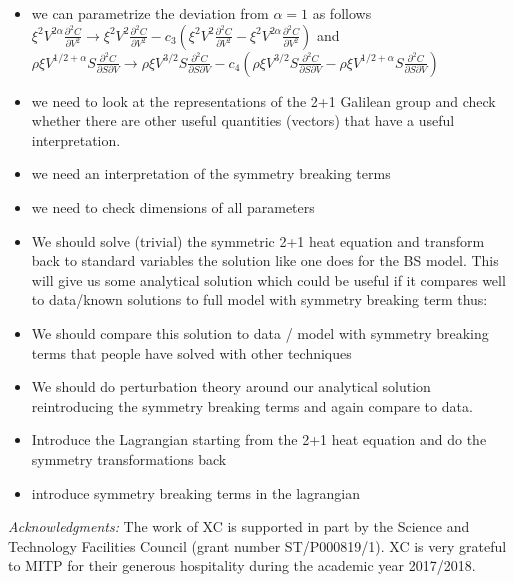 \documentclass[english,12pt]{article}
\def\to{\rightarrow}
\begin{document}
\begin{itemize}
\item we can parametrize the deviation from $\alpha=1$ as follows
$\xi^2 V^{2 \alpha}  \frac{\partial^2 C}{\partial V^2}\to\xi^2 V^{2}  \frac{\partial^2 C}{\partial V^2}- c_3 (\xi^2 V^{2}  \frac{\partial^2 C}{\partial V^2}-\xi^2 V^{2 \alpha}  \frac{\partial^2 C}{\partial V^2}) $ and $\rho \xi V^{1/2+\alpha} S \frac{\partial^2 C}{\partial S \partial V}\to \rho \xi V^{3/2} S \frac{\partial^2 C}{\partial S \partial V} 
- c_4(\rho \xi V^{3/2} S \frac{\partial^2 C}{\partial S \partial V} -
\rho \xi V^{1/2+\alpha} S \frac{\partial^2 C}{\partial S \partial V}) $ 
\item we need to look at the representations of the 2+1 Galilean group and check whether there are other useful quantities (vectors) that have a useful interpretation.
\item we need an interpretation of the symmetry breaking terms
\item we need to check dimensions of all parameters
\item We should solve (trivial) the symmetric 2+1 heat equation and transform back to standard variables the solution like one does for the BS model. This will give us some analytical solution which could be useful if it compares well to data/known solutions to full model with symmetry breaking term thus:
\item We should compare this solution to data / model with symmetry breaking terms that people have solved with other techniques
\item We should do perturbation theory around our analytical solution reintroducing the symmetry breaking terms and again compare to data.
\item Introduce the Lagrangian starting from the 2+1 heat equation and do the symmetry transformations back
\item introduce symmetry breaking terms in the lagrangian
\end{itemize}












{\it Acknowledgments:}
The work of XC is supported in part  by the Science and Technology Facilities Council (grant number  ST/P000819/1). XC is very grateful to MITP for their generous hospitality during the academic year 2017/2018. 



\bigskip{}


\baselineskip=1.6pt 

\begin{thebibliography}{10}

   
\end{thebibliography}
\end{document}
